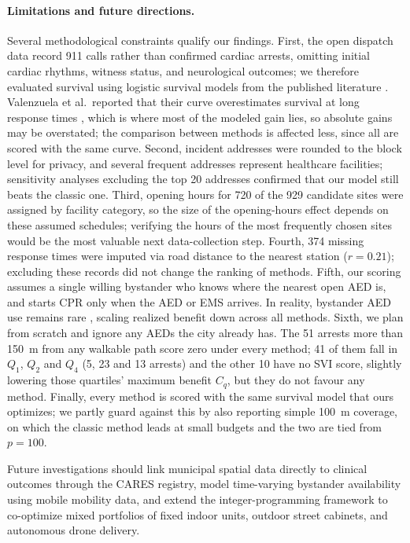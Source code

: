 \documentclass[11pt]{article}
\begin{document}
\paragraph{Limitations and future directions.}
Several methodological constraints qualify our findings. First, the open dispatch data record 911 calls rather than confirmed cardiac arrests, omitting initial cardiac rhythms, witness status, and neurological outcomes; we therefore evaluated survival using logistic survival models from the published literature \cite{valenzuela1997,demaio2003}. Valenzuela et al.\ reported that their curve overestimates survival at long response times \cite{erkut2008}, which is where most of the modeled gain lies, so absolute gains may be overstated; the comparison between methods is affected less, since all are scored with the same curve. Second, incident addresses were rounded to the block level for privacy, and several frequent addresses represent healthcare facilities; sensitivity analyses excluding the top 20 addresses confirmed that our model still beats the classic one. Third, opening hours for 720 of the 929 candidate sites were assigned by facility category, so the size of the opening-hours effect depends on these assumed schedules; verifying the hours of the most frequently chosen sites would be the most valuable next data-collection step. Fourth, 374 missing response times were imputed via road distance to the nearest station ($r=0.21$); excluding these records did not change the ranking of methods. Fifth, our scoring assumes a single willing bystander who knows where the nearest open AED is, and starts CPR only when the AED or EMS arrives. In reality, bystander AED use remains rare \cite{cares2024}, scaling realized benefit down across all methods. Sixth, we plan from scratch and ignore any AEDs the city already has. The 51 arrests more than 150~m from any walkable path score zero under every method; 41 of them fall in $Q_1$, $Q_2$ and $Q_4$ (5, 23 and 13 arrests) and the other 10 have no SVI score, slightly lowering those quartiles' maximum benefit $C_q$, but they do not favour any method. Finally, every method is scored with the same survival model that ours optimizes; we partly guard against this by also reporting simple 100~m coverage, on which the classic method leads at small budgets and the two are tied from $p=100$.

Future investigations should link municipal spatial data directly to clinical outcomes through the CARES registry, model time-varying bystander availability using mobile mobility data, and extend the integer-programming framework to co-optimize mixed portfolios of fixed indoor units, outdoor street cabinets, and autonomous drone delivery.
\end{document}
